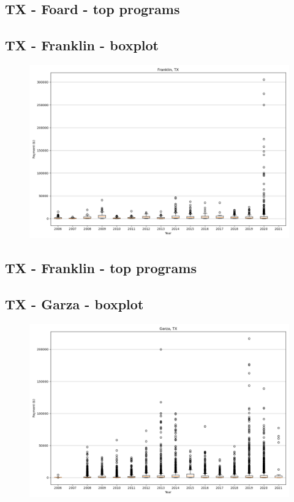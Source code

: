 \subsection*{TX - Foard - top programs}

\newpage
\subsection*{TX - Franklin - boxplot}
\begin{figure}[h]
\centering
\includegraphics[width=7in]{../output/boxplots/counties/Franklin-TX_boxplot.png}
\end{figure}


\subsection*{TX - Franklin - top programs}

\newpage
\subsection*{TX - Garza - boxplot}
\begin{figure}[h]
\centering
\includegraphics[width=7in]{../output/boxplots/counties/Garza-TX_boxplot.png}
\end{figure}


